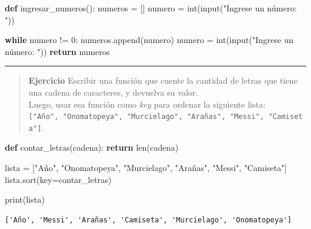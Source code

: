 \documentclass[
  letterpaper,
  DIV=11,
  numbers=noendperiod]{scrreprt}
\newenvironment{Shaded}{\begin{snugshade}}{\end{snugshade}}
\newcommand{\BuiltInTok}[1]{\textcolor[rgb]{0.00,0.23,0.31}{#1}}
\newcommand{\ControlFlowTok}[1]{\textcolor[rgb]{0.00,0.23,0.31}{\textbf{#1}}}
\newcommand{\DecValTok}[1]{\textcolor[rgb]{0.68,0.00,0.00}{#1}}
\newcommand{\KeywordTok}[1]{\textcolor[rgb]{0.00,0.23,0.31}{\textbf{#1}}}
\newcommand{\NormalTok}[1]{\textcolor[rgb]{0.00,0.23,0.31}{#1}}
\newcommand{\OperatorTok}[1]{\textcolor[rgb]{0.37,0.37,0.37}{#1}}
\newcommand{\StringTok}[1]{\textcolor[rgb]{0.13,0.47,0.30}{#1}}
\begin{document}
\begin{Shaded}
\begin{Highlighting}[]
\KeywordTok{def}\NormalTok{ ingresar\_numeros():}
\NormalTok{    numeros }\OperatorTok{=}\NormalTok{ []}
\NormalTok{    numero }\OperatorTok{=} \BuiltInTok{int}\NormalTok{(}\BuiltInTok{input}\NormalTok{(}\StringTok{"Ingrese un número: "}\NormalTok{))}

    \ControlFlowTok{while}\NormalTok{ numero }\OperatorTok{!=} \DecValTok{0}\NormalTok{:}
\NormalTok{        numeros.append(numero)}
\NormalTok{        numero }\OperatorTok{=} \BuiltInTok{int}\NormalTok{(}\BuiltInTok{input}\NormalTok{(}\StringTok{"Ingrese un número: "}\NormalTok{))}
    \ControlFlowTok{return}\NormalTok{ numeros}
\end{Highlighting}
\end{Shaded}

\hfill\break

\begin{center}\rule{0.5\linewidth}{0.5pt}\end{center}

\hfill\break

\begin{quote}
\textbf{Ejercicio} Escribir una función que cuente la cantidad de letras
que tiene una cadena de caracteres, y devuelva su valor.\\
Luego, usar esa función como \emph{key} para ordenar la siguiente lista:
\texttt{{[}"Año",\ "Onomatopeya",\ "Murcielago",\ "Arañas",\ "Messi",\ "Camiseta"{]}}.
\end{quote}

\begin{Shaded}
\begin{Highlighting}[]
\KeywordTok{def}\NormalTok{ contar\_letras(cadena):}
    \ControlFlowTok{return} \BuiltInTok{len}\NormalTok{(cadena)}

\NormalTok{lista }\OperatorTok{=}\NormalTok{ [}\StringTok{"Año"}\NormalTok{, }\StringTok{"Onomatopeya"}\NormalTok{, }\StringTok{"Murcielago"}\NormalTok{, }\StringTok{"Arañas"}\NormalTok{, }\StringTok{"Messi"}\NormalTok{, }\StringTok{"Camiseta"}\NormalTok{]}
\NormalTok{lista.sort(key}\OperatorTok{=}\NormalTok{contar\_letras)}

\BuiltInTok{print}\NormalTok{(lista)}
\end{Highlighting}
\end{Shaded}

\begin{verbatim}
['Año', 'Messi', 'Arañas', 'Camiseta', 'Murcielago', 'Onomatopeya']
\end{verbatim}
\end{document}
